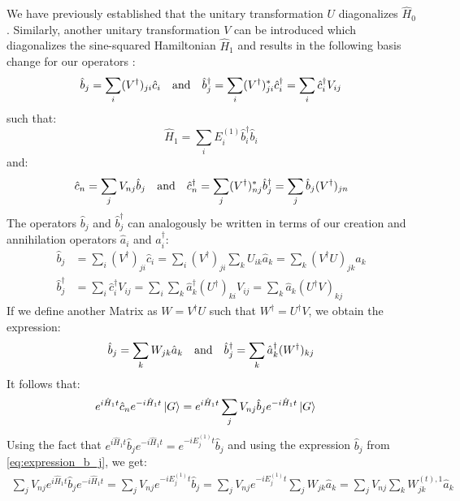 \documentclass[11pt, a4paper, oneside]{book}
\theoremstyle{definition} %
\begin{document}
	 We have previously established that the unitary transformation $U$ diagonalizes $\hat{H}_0$. Similarly, another unitary transformation $V$ can be introduced which diagonalizes the sine-squared Hamiltonian $\hat{H}_1$ and results in the following basis change for our operators \cite{Xueda}:
	\begin{equation}
		\hat{b}_j = \sum_i (V^\dagger)_{ji} \hat{c}_i \qq{and} \hat{b}_j^\dagger = \sum_i (V^\dagger)^*_{ji} \hat{c}_i^\dagger =\sum_i \hat{c}_i^\dagger V_{ij}
	\end{equation}
	such that:
	\begin{equation}
		\hat{H}_1 = \sum_i E_i^{(1)} \hat{b}_i^\dagger \hat{b}_i
	\end{equation}
	and:
	\begin{equation}
		\hat{c}_n = \sum_j V_{nj } \hat{b}_j \qq{and} \hat{c}_n^\dagger = \sum_j (V^\dagger)^*_{nj} \hat{b}_j^\dagger = \sum_j \hat{b}_j (V^\dagger)_{jn}
	\end{equation}
	The operators $\hat{b}_j$ and $\hat{b}_j^\dagger$ can analogously be written in terms of our creation and annihilation operators $\hat{a}_i$ and $\hat{a}_i^\dagger$:
	\begin{align}
		\hat{b}_j &= \sum_i (V^\dagger)_{ji} \hat{c}_i = \sum_i (V^\dagger)_{ji} \sum_k U_{ik} \hat{a}_k = \sum_k (V^\dagger U)_{jk} \hat{a}_k \\
		\hat{b}_j^\dagger &= \sum_i  \hat{c}_i^\dagger V_{ij} = \sum_i \sum_k \hat{a}_k^\dagger (U^\dagger)_{ki} V_{ij} = \sum_k \hat{a}_k (U^\dagger V)_{kj}
	\end{align}
	If we define another Matrix as $W = V^\dagger U$ such that $W^\dagger = U^\dagger V$, we obtain the expression:
	\begin{equation}
		\hat{b}_j = \sum_k W_{jk} \hat{a}_k \qq{and} \hat{b}_j^\dagger = \sum_k \hat{a}_k^\dagger (W^\dagger)_{kj}
		\label{eq:expression_b_j}
	\end{equation}
	It follows that:
	\begin{align}
		e^{i \hat{H}_1 t} \hat{c}_n e^{-i \hat{H}_1 t} \ket{G} &=  e^{i \hat{H}_1 t} \sum_j V_{nj} \hat{b}_j e^{-i \hat{H}_1 t}\ket{G} 
	\end{align}
	Using the fact that $e^{i \hat{H}_1 t} \hat{b}_j e^{-i \hat{H}_1 t} = e^{-i E_j^{(1)} t} \hat{b}_j$ and using the expression $\hat{b}_j$ from \ref{eq:expression_b_j}, we get:
	\begin{align}
		\sum_j V_{nj} e^{i \hat{H}_1 t} \hat{b}_j e^{-i\hat{H}_1 t} = \sum_j V_{nj} e^{-i E_j^{(1)}t} \hat{b}_j = \sum_j V_{nj} e^{-i E_j^{(1)} t} \sum_j W_{jk} \hat{a}_k = \sum_j V_{nj} \sum_k W_{jk}^{(t), 1} \hat{a}_k
	\end{align}
\end{document}
